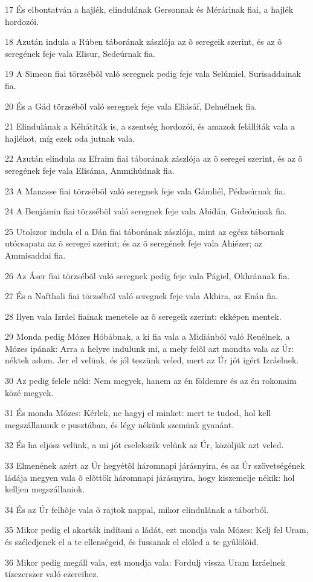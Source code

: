 \par 17 És elbontatván a hajlék, elindulának Gersonnak és Mérárinak fiai, a hajlék hordozói.
\par 18 Azután indula a Rúben táborának zászlója az õ seregeik szerint, és az õ seregének feje vala Elisur, Sedeúrnak fia.
\par 19 A Simeon fiai törzsébõl való seregnek pedig feje vala Selúmiel, Surisaddainak fia.
\par 20 És a Gád törzsébõl való seregnek feje vala Eliásáf, Dehuélnek fia.
\par 21 Elindulának a Kéhátiták is, a szentség hordozói, és amazok felállíták vala a hajlékot, míg ezek oda jutnak vala.
\par 22 Azután elindula az Efraim fiai táborának zászlója az õ seregei szerint, és az õ seregének feje vala Elisáma, Ammihúdnak fia.
\par 23 A Manasse fiai törzsébõl való seregnek feje vala Gámliél, Pédasúrnak fia.
\par 24 A Benjámin fiai törzsébõl való seregnek feje vala Abidán, Gideóninak fia.
\par 25 Utolszor indula el a Dán fiai táborának zászlója, mint az egész tábornak utócsapata az õ seregei szerint; és az õ seregének feje vala Ahiézer; az Ammisaddai fia.
\par 26 Az Áser fiai törzsébõl való seregnek pedig feje vala Págiel, Okhránnak fia.
\par 27 És a Nafthali fiai törzsébõl való seregnek feje vala Akhira, az Enán fia.
\par 28 Ilyen vala Izráel fiainak menetele az õ seregeik szerint: ekképen mentek.
\par 29 Monda pedig Mózes Hóbábnak, a ki fia vala a Midiánból való Reuélnek, a Mózes ipának: Arra a helyre indulunk mi, a mely felõl azt mondta vala az Úr: néktek adom. Jer el velünk, és jól teszünk veled, mert az Úr jót igért Izráelnek.
\par 30 Az pedig felele néki: Nem megyek, hanem az én földemre és az én rokonaim közé megyek.
\par 31 És monda Mózes: Kérlek, ne hagyj el minket: mert te tudod, hol kell megszállanunk e pusztában, és légy nékünk szemünk gyanánt.
\par 32 És ha eljösz velünk, a mi jót cselekszik velünk az Úr, közöljük azt veled.
\par 33 Elmenének azért az Úr hegyétõl háromnapi járásnyira, és az Úr szövetségének ládája megyen vala õ elõttök háromnapi járásnyira, hogy kiszemelje nékik: hol kelljen megszállaniok.
\par 34 És az Úr felhõje vala õ rajtok nappal, mikor elindulának a táborból.
\par 35 Mikor pedig el akarták indítani a ládát, ezt mondja vala Mózes: Kelj fel Uram,  és széledjenek el a te ellenségeid, és fussanak el elõled a te gyûlölõid.
\par 36 Mikor pedig megáll vala, ezt mondja vala: Fordulj vissza Uram Izráelnek tízezerszer való ezereihez.

